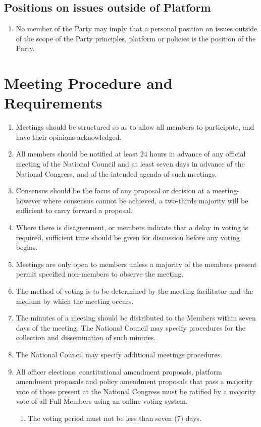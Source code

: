\documentclass[a4paper,titlepage,8.5pt]{article}
\begin{document}
\subsection{Positions on issues outside of Platform}

\begin{enumerate}
\item No member of the Party may imply that a personal position on issues outside of the scope of the Party principles, platform or policies is the position of the Party.
\end{enumerate}

\section{Meeting Procedure and Requirements}

\begin{enumerate}
\item Meetings should be structured so as to allow all members to participate, and have their opinions acknowledged.
\item All members should be notified at least 24 hours in advance of any official meeting of the National Council and at least seven days in advance of the National Congress, and of the intended agenda of such meetings.
\item Consensus should be the focus of any proposal or decision at a meeting- however where consensus cannot be achieved, a two-thirds majority will be sufficient to carry forward a proposal.
\item Where there is disagreement, or members indicate that a delay in voting is required, sufficient time should be given for discussion before any voting begins.
\item Meetings are only open to members unless a majority of the members present permit specified non-members to observe the meeting.  
\item The method of voting is to be determined by the meeting facilitator and the medium by which the meeting occurs.
\item The minutes of a meeting should be distributed to the Members within seven days of the meeting. The National Council may specify procedures for the collection and dissemination of such minutes.
\item The National Council may specify additional meetings procedures.
\item All officer elections, constitutional amendment proposals, platform amendment proposals and policy amendment proposals that pass a majority vote of those present at the National Congress must be ratified by a majority vote of all Full Members using an online voting system.
\begin{enumerate}
\item The voting period must not be less than seven (7) days.
\end{enumerate}
\end{enumerate}
\end{document}
